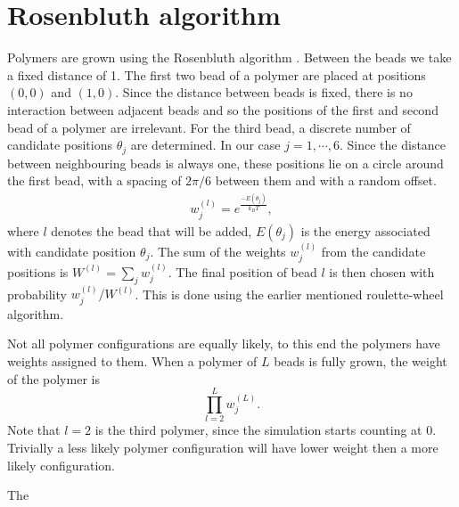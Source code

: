 \section{Rosenbluth algorithm}
Polymers are grown using the Rosenbluth algorithm \cite{rosenbluth1955monte}. Between the beads we take a fixed distance of 1. The first two bead of a polymer are placed at positions $(0,0)$ and $(1,0)$. Since the distance between beads is fixed, there is no interaction between adjacent beads and so the positions of the first and second bead of a polymer are irrelevant. For the third bead, a discrete number of candidate positions $\theta_j$ are determined. In our case $j=1,\cdots,6$. Since the distance between neighbouring beads is always one, these positions lie on a circle around the first bead, with a spacing of $2\pi/6$ between them and with a random offset. 
\begin{gather}
    w_j^{(l)} = e^\frac{-E(\theta_j)}{k_BT},
\end{gather} where $l$ denotes the bead that will be added, $E(\theta_j)$ is the energy associated with candidate position $\theta_j$. The sum of the weights $w_j^{(l)}$ from the candidate positions is $W^{(l)} = \sum_j w_j^{(l)}$. The final position of bead $l$ is then chosen with probability $w_j^{(l)}/W^{(l)}$. This is done using the earlier mentioned roulette-wheel algorithm. 

Not all polymer configurations are equally likely, to this end the polymers have weights assigned to them. When a polymer of $L$ beads is fully grown, the weight of the polymer is 
\begin{equation}\label{eq:polymer_weight}
    \prod_{l=2}^L w_j^{(L)}.
\end{equation} Note that $l=2$ is the third polymer, since the simulation starts counting at $0$. Trivially a less likely polymer configuration will have lower weight then a more likely configuration.

The 

